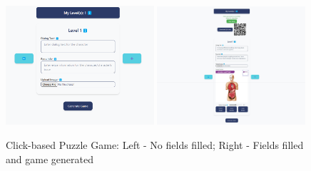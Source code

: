 \begin{figure}
\centering
\includegraphics[width=0.49\textwidth]{figures/Diagnose_Game/Instructor_Portal_Diagnose_Game.png}
\includegraphics[width=0.49\textwidth]{figures/Diagnose_Game/Instructor_Portal_Diagnose_Game_Generated.jpeg}
\caption{Click-based Puzzle Game: Left - No fields filled; Right - Fields filled and game generated}
\label{fig:click-based-puzzle-game}
\end{figure}